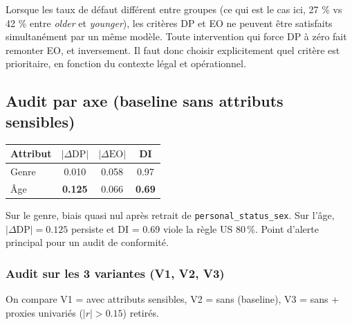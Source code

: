 \documentclass[11pt, a4paper]{article}
\begin{document}
\begin{attentionbox}
Lorsque les taux de défaut différent entre groupes (ce qui est le cas ici, 27 \% vs 42 \% entre \emph{older} et \emph{younger}), les critères DP et EO ne peuvent être satisfaits simultanément par un même modèle. Toute intervention qui force DP à zéro fait remonter EO, et inversement. Il faut donc choisir explicitement quel critère est prioritaire, en fonction du contexte légal et opérationnel.
\end{attentionbox}

\subsection{Audit par axe (baseline sans attributs sensibles)}

\begin{table}[H]
\centering
\begin{tabular}{lccc}
\toprule
\textbf{Attribut} & $|\Delta\text{DP}|$ & $|\Delta\text{EO}|$ & \textbf{DI} \\
\midrule
Genre & 0.010 & 0.058 & 0.97 \\
Âge   & \textbf{0.125} & 0.066 & \textbf{0.69} \\
\bottomrule
\end{tabular}
\end{table}

\begin{leconbox}[Constat]
Sur le genre, biais quasi nul après retrait de \texttt{personal\_status\_sex}. Sur l'âge, $|\Delta\text{DP}| = 0.125$ persiste et DI = 0.69 viole la règle US 80\,\%. Point d'alerte principal pour un audit de conformité.
\end{leconbox}

\subsubsection*{Audit sur les 3 variantes (V1, V2, V3)}

On compare V1 = avec attributs sensibles, V2 = sans (baseline), V3 = sans + proxies univariés ($|r| > 0.15$) retirés.
\end{document}
